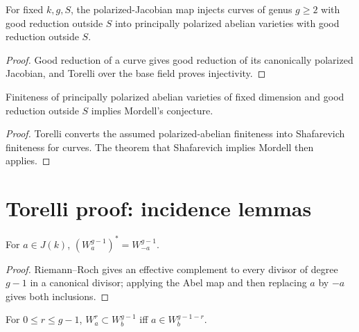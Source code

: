 \begin{corollary}
\label{cor:milne-torelli-finiteness-source}

For fixed $k,g,S$, the polarized-Jacobian map injects curves of genus $g\ge2$
with good reduction outside $S$ into principally polarized abelian varieties
with good reduction outside $S$.
\end{corollary}
\begin{proof}
Good reduction of a curve gives good reduction of its canonically polarized
Jacobian, and Torelli over the base field proves injectivity.
\end{proof}

\begin{corollary}
\label{cor:milne-torelli-mordell-source}

Finiteness of principally polarized abelian varieties of fixed dimension and
good reduction outside $S$ implies Mordell's conjecture.
\end{corollary}
\begin{proof}
Torelli converts the assumed polarized-abelian finiteness into Shafarevich
finiteness for curves.  The theorem that Shafarevich implies Mordell then
applies.
\end{proof}

\section{Torelli proof: incidence lemmas}
\begin{lemma}
\label{lem:milne-torelli-theta-symmetry-source}

For $a\in J(k)$, $(W_a^{g-1})^*=W_{-a}^{g-1}$.
\end{lemma}

\begin{proof}

Riemann--Roch gives an effective complement to every divisor of degree $g-1$
in a canonical divisor; applying the Abel map and then replacing $a$ by $-a$
gives both inclusions.

\end{proof}


\begin{lemma}
\label{lem:milne-torelli-incidence-source}

For $0\le r\le g-1$, $W_a^r\subset W_b^{g-1}$ iff
$a\in W_b^{g-1-r}$.
\end{lemma}

